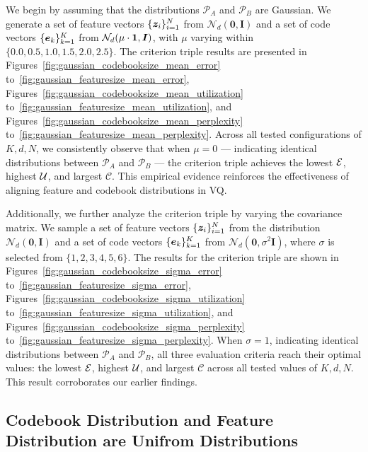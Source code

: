 We begin by assuming that the distributions $\mathcal{P}_A$ and $\mathcal{P}_B$ are Gaussian. We generate a set of feature vectors $\{\bm{z}_i\}_{i=1}^N$ from $\mathcal{N}_d(\bm 0,  \bm I)$ and a set of code vectors $\{\bm{e}_k\}_{k=1}^K$ from $\mathcal{N}_d(\mu \cdot \mathbf{1}, \bm I)$, with $\mu$ varying within $\{0.0, 0.5, 1.0, 1.5, 2.0, 2.5\}$. The criterion triple results are presented in Figures~\ref{fig:gaussian_codebooksize_mean_error} to~\ref{fig:gaussian_featuresize_mean_error}, Figures~\ref{fig:gaussian_codebooksize_mean_utilization} to~\ref{fig:gaussian_featuresize_mean_utilization}, and Figures~\ref{fig:gaussian_codebooksize_mean_perplexity} to~\ref{fig:gaussian_featuresize_mean_perplexity}. Across all tested configurations of $K, d, N$, we consistently observe that when $\mu = 0$ — indicating identical distributions between $\mathcal{P}_A$ and $\mathcal{P}_B$ — the criterion triple achieves the lowest $\mathcal{E}$, highest $\mathcal{U}$, and largest $\mathcal{C}$. This empirical evidence reinforces the effectiveness of aligning feature and codebook distributions in VQ.

Additionally, we further analyze the criterion triple by varying the covariance matrix. We sample a set of feature vectors $\{\bm{z}_i\}_{i=1}^N$ from the distribution $\mathcal{N}_d(\bm 0, \bm I)$ and a set of code vectors $\{\bm{e}_k\}_{k=1}^K$ from $\mathcal{N}_d(\bm 0, \sigma^2 \bm I)$, where $\sigma$  is selected from $\{ 1, 2, 3, 4, 5, 6\}$. The results for the criterion triple are shown in Figures~\ref{fig:gaussian_codebooksize_sigma_error} to~\ref{fig:gaussian_featuresize_sigma_error}, Figures~\ref{fig:gaussian_codebooksize_sigma_utilization} to~\ref{fig:gaussian_featuresize_sigma_utilization}, and Figures~\ref{fig:gaussian_codebooksize_sigma_perplexity} to~\ref{fig:gaussian_featuresize_sigma_perplexity}. When $\sigma = 1$, indicating identical distributions between $\mathcal{P}_A$ and $\mathcal{P}_B$, all three evaluation criteria reach their optimal values: the lowest $\mathcal{E}$, highest $\mathcal{U}$, and largest $\mathcal{C}$ across all tested values of $K, d, N$. This result corroborates our earlier findings.

\subsection{Codebook Distribution and Feature Distribution are Unifrom Distributions}
\label{appendix:analyses under uniform distribution}

